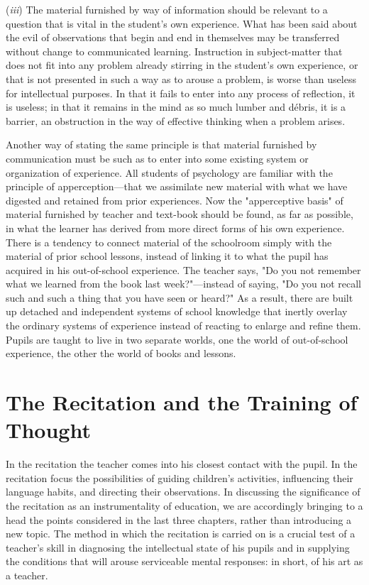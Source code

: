 \documentclass[showtrims,ustradepaper]{memoir}
\begin{document}

(\emph{iii}) The material furnished by way of information should be
relevant to a question that is vital in the student's own experience.
What has been said about the evil of observations that begin and end in
themselves may be transferred without change to communicated learning.
Instruction in subject-matter that does not fit into any problem already
stirring in the student's own experience, or that is not presented in
such a way as to arouse a problem, is worse than useless for
intellectual purposes. In that it fails to enter into any process of
reflection, it is useless; in that it remains in the mind as so much
lumber and débris, it is a barrier, an obstruction in the way of
effective thinking when a problem arises.


Another way of stating the same principle is that material furnished by
communication must be such as to enter into some existing system or
organization of experience. All students of psychology are familiar with
the principle of apperception---that we assimilate new material with
what we have digested and retained from prior experiences. Now the
"apperceptive basis" of material furnished by teacher and text-book
should be found, as far as possible, in what the learner has derived
from more direct forms of his own experience. There is a tendency to
connect material of the schoolroom simply with the material of prior
school lessons, instead of linking it to what the pupil has acquired in
his out-of-school experience. The teacher says, "Do you not remember
what we learned from the book last week?"---instead of saying, "Do you
not recall such and such a thing that you have seen or heard?" As a
result, there are built up detached and independent systems of school
knowledge that inertly overlay
the
ordinary systems of experience instead of reacting to enlarge and refine
them. Pupils are taught to live in two separate worlds, one the world of
out-of-school experience, the other the world of books and
lessons.

\chapter{The Recitation and the Training of Thought}


In the recitation the teacher comes into his closest contact with the
pupil. In the recitation focus the possibilities of guiding children's
activities, influencing their language habits, and directing their
observations. In discussing the significance of the recitation as an
instrumentality of education, we are accordingly bringing to a head the
points considered in the last three chapters, rather than introducing a
new topic. The method in which the recitation is carried on is a crucial
test of a teacher's skill in diagnosing the intellectual state of his
pupils and in supplying the conditions that will arouse serviceable
mental responses: in short, of his art as a teacher.
\end{document}
